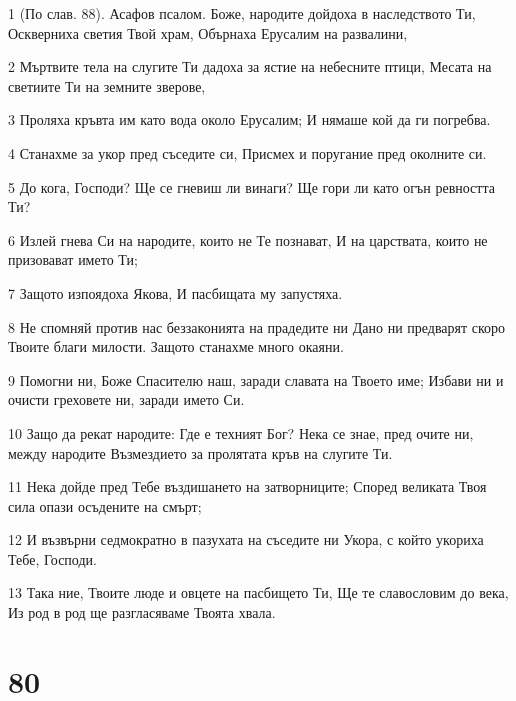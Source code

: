 \par 1 (По слав. 88). Асафов псалом. Боже, народите дойдоха в наследството Ти, Оскверниха светия Твой храм, Обърнаха Ерусалим на развалини,
\par 2 Мъртвите тела на слугите Ти дадоха за ястие на небесните птици, Месата на светиите Ти на земните зверове,
\par 3 Проляха кръвта им като вода около Ерусалим; И нямаше кой да ги погребва.
\par 4 Станахме за укор пред съседите си, Присмех и поругание пред околните си.
\par 5 До кога, Господи? Ще се гневиш ли винаги? Ще гори ли като огън ревността Ти?
\par 6 Излей гнева Си на народите, които не Те познават, И на царствата, които не призовават името Ти;
\par 7 Защото изпоядоха Якова, И пасбищата му запустяха.
\par 8 Не спомняй против нас беззаконията на прадедите ни Дано ни предварят скоро Твоите благи милости. Защото станахме много окаяни.
\par 9 Помогни ни, Боже Спасителю наш, заради славата на Твоето име; Избави ни и очисти греховете ни, заради името Си.
\par 10 Защо да рекат народите: Где е техният Бог? Нека се знае, пред очите ни, между народите Възмездието за пролятата кръв на слугите Ти.
\par 11 Нека дойде пред Тебе въздишането на затворниците; Според великата Твоя сила опази осъдените на смърт;
\par 12 И възвърни седмократно в пазухата на съседите ни Укора, с който укориха Тебе, Господи.
\par 13 Така ние, Твоите люде и овцете на пасбището Ти, Ще те славословим до века, Из род в род ще разгласяваме Твоята хвала.

\chapter{80}

